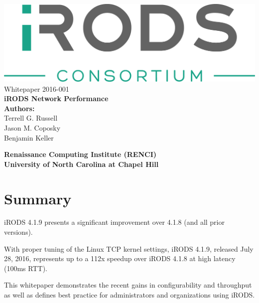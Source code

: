 \documentclass[letter, 11pt]{article}
\begin{document}
\begin{titlepage}
\begin{center}

\includegraphics[scale=0.6]{iRODS-Consortium-Logo.png}\\[10pt]
\large{Whitepaper 2016-001}\\[100pt]

\textbf{\huge iRODS Network Performance}\\[190pt]

\textbf {\large Authors:}\\[0.2cm]
\large {Terrell G. Russell}\\[0.1cm]
\large {Jason M. Coposky}\\[0.1cm]
\large {Benjamin Keller}\\[0.1cm]

\vspace{50pt}

\textbf{\large Renaissance Computing Institute (RENCI)}\\[10pt]
\textbf{\large University of North Carolina at Chapel Hill}\\

\end{center}
\end{titlepage}

\clearpage
\tableofcontents
\thispagestyle{empty}

\clearpage

\section{Summary}
iRODS 4.1.9 presents a significant improvement over 4.1.8 (and all prior versions).

With proper tuning of the Linux TCP kernel settings, iRODS 4.1.9, released July 28, 2016, represents up
to a 112x speedup over iRODS 4.1.8 at high latency (100ms RTT).

This whitepaper demonstrates the recent gains in configurability and
throughput as well as defines best practice for administrators and organizations using iRODS.
\end{document}
